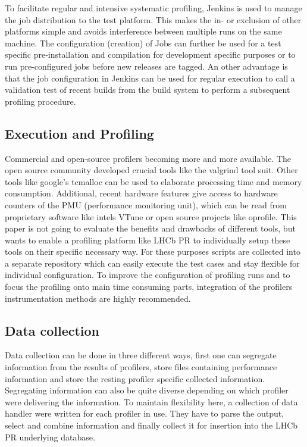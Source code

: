 \documentclass[a4paper]{jpconf}
\begin{document}
To facilitate regular and intensive systematic profiling, Jenkins is used to manage the job distribution to the test platform. This makes the in- or exclusion of other platforms simple and avoids interference between multiple runs on the same machine. The configuration (creation) of Jobs can further be used for a test specific pre-installation and compilation for development specific purposes or to run pre-configured jobs before new releases are tagged.
\newline
An other advantage is that the job configuration in Jenkins can be used for regular execution to call a validation test of recent builds from the build system to perform a subsequent profiling procedure.  

\subsection{Execution and Profiling}
\label{sec:execution_and_profiling}

Commercial and open-source profilers becoming more and more available. The open source community developed crucial tools like the valgrind tool suit. Other tools like google's tcmalloc can be used to elaborate processing time and memory consumption. Additional, recent hardware features give access to hardware counters of the PMU (performance monitoring unit), which can be read from proprietary software like intels VTune or open source projects like oprofile.
\newline
This paper is not going to evaluate the benefits and drawbacks of different tools, but wants to enable a profiling platform like LHCb PR to individually setup these tools on their specific necessary way. For these purposes scripts are collected into a separate repository which can easily execute the test cases and stay flexible for individual configuration. To improve the configuration of profiling runs and to focus the profiling onto main time consuming parts, integration of the profilers instrumentation methods are highly recommended.

\subsection{Data collection}
\label{sec:data_collection}

Data collection can be done in three different ways, first one can segregate information from the results of profilers, store files containing performance information and store the resting profiler specific collected information. Segregating information can also be quite diverse depending on which profiler were delivering the information. To maintain flexibility here, a collection of data handler were written for each profiler in use. They have to parse the output, select and combine information and finally collect it for insertion into the LHCb PR underlying database.  
\end{document}
